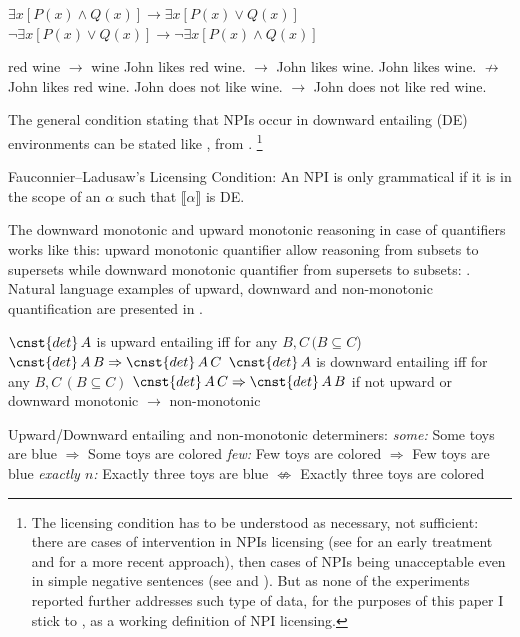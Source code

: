 \documentclass[output=paper,
]{langscibook}
\begin{document}
\ea \label{ex-11} \ea \label{ex-11-a} $\exists x[P(x) \wedge Q(x)] \rightarrow \exists x[P(x) \vee Q(x)]$
\ex \label{ex-11-b} $\neg \exists x[P(x) \vee Q(x)] \rightarrow \neg \exists x[P(x) \wedge Q(x)]$
\z
\z

\ea\label{ex-12} red wine $\rightarrow$ wine
\ea\label{ex-12-a} John likes red wine. $\rightarrow$ John likes wine.
\ex\label{ex-12-b} John likes wine. $\not\rightarrow$ John likes red wine.
\ex\label{ex-12-c} John does not like wine. $\rightarrow$ John does not like red wine.
\z
\z

\noindent The general condition stating that NPIs occur in  downward entailing (DE) environments can be stated like , from \citep[100]{von1999npi}.%
\footnote{The licensing condition has to be understood as necessary, not sufficient: there are cases of intervention in NPIs licensing (see \citealt{linebarger1987negative} for an early treatment and \citealt{homer2008disruption} for a more recent approach), then cases of NPIs being unacceptable even in simple negative sentences (see \citealt{uribe1994interface} and \citealt{Blasczak:2001}). But as none of the experiments reported further addresses such type of data, for the purposes of this paper I stick to , as a working definition of NPI licensing.}

\eanoraggedright\label{ex-13} Fauconnier--Ladusaw's Licensing Condition: An NPI is only
grammatical if it is in the scope of an $\alpha$ such that
$\llbracket \alpha \rrbracket$ is DE.%
\z

\noindent The downward monotonic and upward monotonic reasoning in case of quantifiers works like this:  upward monotonic quantifier allow reasoning from  subsets to supersets while downward monotonic quantifier from  supersets to subsets: . Natural language examples of upward, downward and non-monotonic quantification are presented in .

\ea \label{ex-14} \ea $\cnst{det}\,A$ is upward entailing iff for any $B, C\, (B \subseteq C$) $\cnst{det}\,A\,B \Rightarrow \cnst{det}\,A\,C$
\ex $\cnst{det}\,A$ is downward entailing iff
for any $B, C\,(B \subseteq C)$ $\cnst{det}\,A\,C \Rightarrow \cnst{det}\,A\,B$
\ex if not upward or downward monotonic $\rightarrow$ non-monotonic
\z
\z

\ea \label{ex-15} Upward/Downward entailing and non-monotonic determiners:
\ea \textit{some:} Some toys are blue $\Rightarrow$ Some toys are colored
\ex \textit{few:} Few toys are colored $\Rightarrow$ Few toys are blue
\ex \textit{exactly $n$:} Exactly three toys are blue $\not\Leftrightarrow$ Exactly three toys are colored
\z
\z
\end{document}
